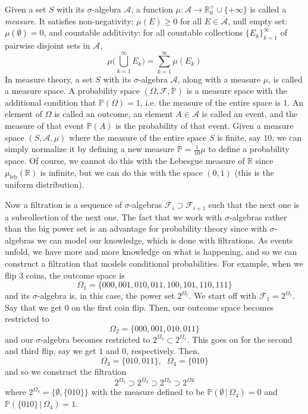 \documentclass{article}
\theoremstyle{remark}
\theoremstyle{definition}
\begin{document}
Given a set $S$ with its $\sigma$-algebra $\mathcal{A}$, a function $\mu: \mathcal{A} \longrightarrow \mathbb{R}^+_0 \cup \{+\infty\}$ is called a \textit{measure}. It satisfies non-negativity: $\mu(E) \geq 0$ for all $E \in \mathcal{A}$, null empty set: $\mu(\emptyset) = 0$, and countable additivity: for all countable collections $\{E_k\}_{k=1}^\infty$ of pairwise disjoint sets in $\mathcal{A}$, 
\[\mu \bigg( \bigcup_{k=1}^\infty E_k \bigg) = \sum_{k=1}^\infty \mu(E_k)\]
In measure theory, a set $S$ with its $\sigma$-algebra $\mathcal{A}$, along with a measure $\mu$, is called a measure space. A probability space $(\Omega, \mathcal{F}, \mathbb{P})$ is a measure space with the additional condition that $\mathbb{P}(\Omega) = 1$, i.e. the measure of the entire space is $1$. An element of $\Omega$ is called an outcome, an element $A \in \mathcal{A}$ is called an event, and the measure of that event $\mathbb{P}(A)$ is the probability of that event. Given a measure space $(S, \mathcal{A}, \mu)$ where the measure of the entire space $S$ is finite, say $10$, we can simply normalize it by defining a new measure $\mathbb{P} = \frac{1}{10} \mu$ to define a probability space. Of course, we cannot do this with the Lebesgue measure of $\mathbb{R}$ since $\mu_{\mathrm{leb}}(\mathbb{R})$ is infinite, but we can do this with the space $(0, 1)$ (this is the uniform distribution). 

Now a filtration is a sequence of $\sigma$-algebras $\mathcal{F}_i \supset \mathcal{F}_{i+1}$ such that the next one is a subcollection of the next one. The fact that we work with $\sigma$-algebras rather than the big power set is an advantage for probability theory since with $\sigma$-algebras we can model our knowledge, which is done with filtrations. As events unfold, we have more and more knowledge on what is happening, and so we can construct a filtration that models conditional probabilities. For example, when we flip $3$ coins, the outcome space is 
\[\Omega_1 = \{000, 001, 010, 011, 100, 101, 110, 111\}\]
and its $\sigma$-algebra is, in this case, the power set $2^{\Omega_1}$. We start off with $\mathcal{F}_1 = 2^{\Omega_1}$. Say that we get $0$ on the first coin flip. Then, our outcome space becomes restricted to 
\[\Omega_2 = \{000, 001, 010, 011\}\]
and our $\sigma$-algebra becomes restricted to $2^{\Omega_2} \subset 2^{\Omega_1}$. This goes on for the second and third flip, say we get $1$ and $0$, respectively. Then, 
\[\Omega_3 = \{010, 011\}, \;\; \Omega_4 = \{010\}\]
and so we construct the filtration 
\[2^{\Omega_1} \supset 2^{\Omega_2} \supset 2^{\Omega_3} \supset 2^{\Omega4}\]
where $2^{\Omega_4} = \{\emptyset, \{010\}\}$ with the measure defined to be $\mathbb{P}(\emptyset\,|\,\Omega_4) = 0$ and $\mathbb{P}(\{010\}\,|\,\Omega_4) = 1$. 
\end{document}
